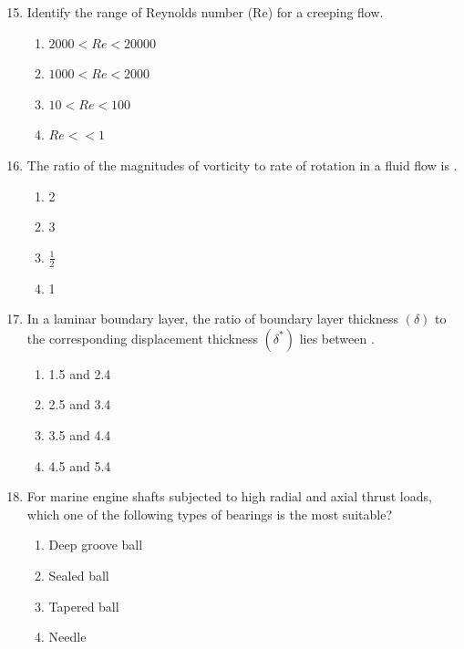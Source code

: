 \documentclass[journal]{IEEEtran}
\theoremstyle{remark}
\begin{document}
\begin{enumerate}[itemsep=1em]
\setcounter{enumi}{14}
\item Identify the range of Reynolds number (Re) for a creeping flow. 

\begin{enumerate}[leftmargin=2.5em, labelsep=0.5em, itemsep=0.5em]
    \item $2000 < Re < 20000$ 
    \item $1000 < Re < 2000$ 
    \item $10 < Re < 100$ 
    \item $Re << 1$ 
\end{enumerate}   
\end{enumerate}

\begin{enumerate}[itemsep=1em]
\setcounter{enumi}{15}
\item The ratio of the magnitudes of vorticity to rate of rotation in a fluid flow is \underline{\hspace{1cm}}.
\begin{multicols}{4}
\begin{enumerate}
    \item 2
    \item 3
    \item $\frac{1}{2}$
    \item 1
\end{enumerate}
\end{multicols}
\end{enumerate}

\begin{enumerate}[itemsep=1em]
\setcounter{enumi}{16}
\item In a laminar boundary layer, the ratio of boundary layer thickness $(\delta)$ to the corresponding displacement thickness $(\delta^*)$ lies between \underline{\hspace{1cm}}. 
\begin{multicols}{4}
\begin{enumerate}
    \item 1.5 and 2.4
    \item 2.5 and 3.4
    \item 3.5 and 4.4
    \item 4.5 and 5.4
\end{enumerate}
\end{multicols}
\end{enumerate}

\begin{enumerate}[itemsep=1em]
\setcounter{enumi}{17}
\item  For marine engine shafts subjected to high radial and axial thrust loads, which one of the following types of bearings is the most suitable? 
\begin{enumerate}[leftmargin=2.5em, labelsep=0.5em, itemsep=0.5em]
    \item Deep groove ball
    \item Sealed ball
    \item Tapered ball
    \item Needle
\end{enumerate}

\end{enumerate}
\end{document}

